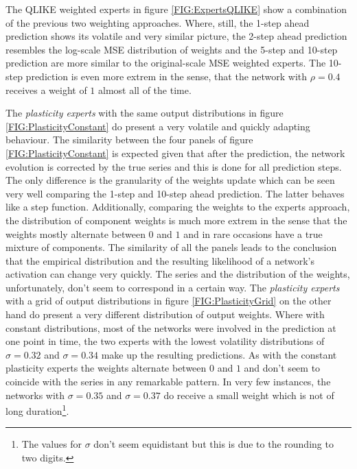 The QLIKE weighted experts in figure \ref{FIG:ExpertsQLIKE} show a combination of the previous two weighting approaches. Where, still, the 1-step ahead prediction shows its volatile and very similar picture, the 2-step ahead prediction resembles the log-scale MSE distribution of weights and the 5-step and 10-step prediction are more similar to the original-scale MSE weighted experts. The 10-step prediction is even more extrem in the sense, that the network with $\rho = 0.4$ receives a weight of $1$ almost all of the time.

The \textit{plasticity experts} with the same output distributions in figure \ref{FIG:PlasticityConstant} do present a very volatile and quickly adapting behaviour. The similarity between the four panels of figure \ref{FIG:PlasticityConstant} is expected given that after the prediction, the network evolution is corrected by the true series and this is done for all prediction steps. The only difference is the granularity of the weights update which can be seen very well comparing the 1-step and 10-step ahead prediction. The latter behaves like a step function. Additionally, comparing the weights to the experts approach, the distribution of component weights is much more extrem in the sense that the weights mostly alternate between $0$ and $1$ and in rare occasions have a true mixture of components. The similarity of all the panels leads to the conclusion that the empirical distribution and the resulting likelihood of a network's activation can change very quickly. The series and the distribution of the weights, unfortunately, don't seem to correspond in a certain way.
The \textit{plasticity experts} with a grid of output distributions in figure \ref{FIG:PlasticityGrid} on the other hand do present a very different distribution of output weights. Where with constant distributions, most of the networks were involved in the prediction at one point in time, the two experts with the lowest volatility distributions of $\sigma = 0.32$ and $\sigma = 0.34$ make up the resulting predictions. As with the constant plasticity experts the weights alternate between $0$ and $1$ and don't seem to coincide with the series in any remarkable pattern. In very few instances, the networks with $\sigma = 0.35$ and $\sigma = 0.37$ do receive a small weight which is not of long duration\footnote{The values for $\sigma$ don't seem equidistant but this is due to the rounding to two digits.}.

